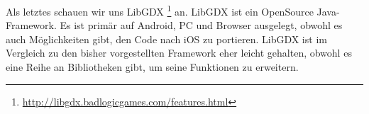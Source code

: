 Als letztes schauen wir uns LibGDX \footnote{\url{http://libgdx.badlogicgames.com/features.html}} an.
LibGDX ist ein OpenSource Java-Framework. 
Es ist primär auf Android, PC und Browser ausgelegt, obwohl es auch Möglichkeiten gibt, den Code nach iOS zu portieren.
LibGDX ist im Vergleich zu den bisher vorgestellten Framework eher leicht gehalten, obwohl es eine Reihe an Bibliotheken gibt, um seine Funktionen zu erweitern.